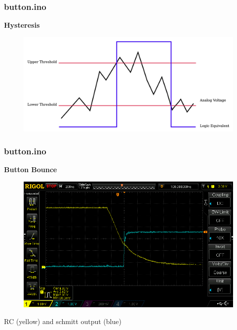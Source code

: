 \documentclass[t]{beamer}
\begin{document}

\begin{frame}[t]
\frametitle{button.ino}
\textbf{Hysteresis}
\begin{figure}
	\includegraphics[scale=0.43]{hysteresis1.png}
\end{figure}
\end{frame}




\begin{frame}[t]
\frametitle{button.ino}
\textbf{Button Bounce}

\begin{figure}
	\includegraphics[scale=0.3]{bounceRCschmitt.png}
\end{figure}
\centering
RC (yellow) and schmitt output (blue)

\end{frame}

\end{document}
